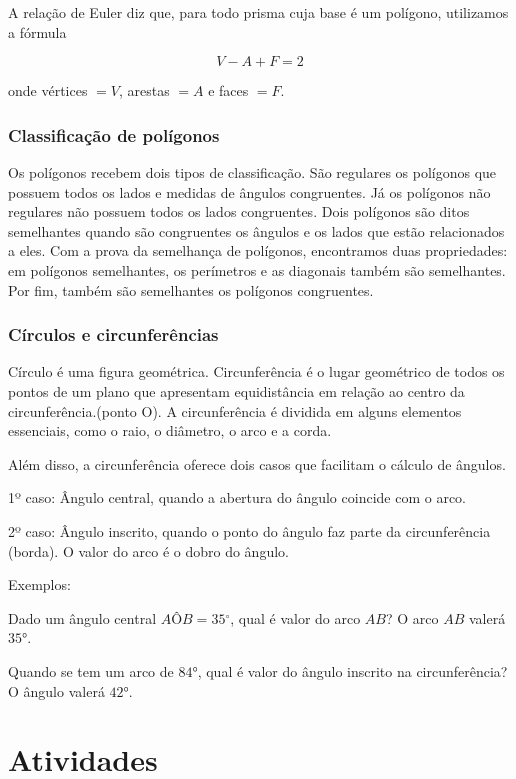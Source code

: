 {A relação de Euler diz que, para todo prisma cuja base é um polígono,
utilizamos a fórmula

$$V - A + F = 2$$

onde vértices $= V$, arestas $= A$ e faces $= F$.

\subsubsection{Classificação de polígonos}

Os polígonos recebem dois tipos de classificação. São regulares os
polígonos que possuem todos os lados e medidas de ângulos congruentes.
Já os polígonos não regulares não possuem todos os lados congruentes.
Dois polígonos são ditos semelhantes quando são congruentes os ângulos e
os lados que estão relacionados a eles. Com a prova da semelhança de
polígonos, encontramos duas propriedades: em polígonos semelhantes, os
perímetros e as diagonais também são semelhantes. Por fim, também são
semelhantes os polígonos congruentes.

\subsubsection{Círculos e circunferências}

Círculo é uma figura geométrica. Circunferência é o lugar geométrico de
todos os pontos de um plano que apresentam equidistância em relação ao
centro da circunferência.(ponto O). A circunferência é dividida em
alguns elementos essenciais, como o raio, o diâmetro, o arco e a corda.

Além disso, a circunferência oferece dois casos que facilitam o cálculo
de ângulos.

1º caso: Ângulo central, quando a abertura do ângulo coincide com o
arco.

2º caso: Ângulo inscrito, quando o ponto do ângulo faz parte da
circunferência (borda). O valor do arco é o dobro do ângulo.

\medskip \noindent  Exemplos:

Dado um ângulo central $AÔB = 35{^\circ}$, qual é valor do arco $AB$?
O arco $AB$ valerá $35°$.

Quando se tem um arco de $84°$, qual é valor do ângulo inscrito na
circunferência? O ângulo valerá $42°$.
}

\section*{Atividades}

